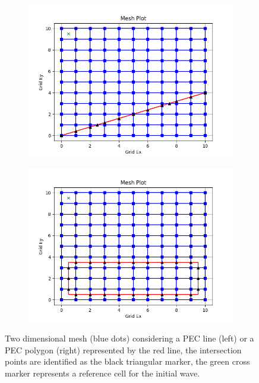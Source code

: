\documentclass[12pt, oneside]{book}
\begin{document}
\begin{figure}[h!]
    \centering
    \begin{subfigure}[b]{0.49\textwidth}
        \centering
        \includegraphics[width=\textwidth]{Imagenes/CFDTD2D_MeshPECLine.png}
    \end{subfigure}
    \begin{subfigure}[b]{0.49\textwidth}
        \centering
        \includegraphics[width=\textwidth]{Imagenes/CFDTD2D_MeshPECPolygon.png}
    \end{subfigure}
    \caption{Two dimensional mesh (blue dots) considering a PEC line (left) or a PEC polygon (right) represented by the red line, the intersection points are identified as the black triangular marker, the green cross marker represents a reference cell for the initial wave.}
    \label{fig:CFDTD2D_MeshPEC}
\end{figure}
\end{document}

